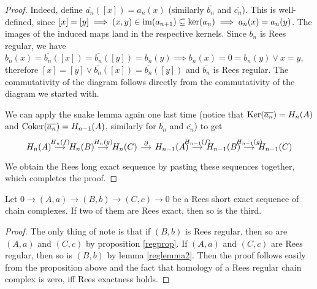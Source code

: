 \begin{proof}[Proof]
    Indeed, define $\overline{a_n}([x]) = a_n(x)$ (similarly $\overline{b_n}$ and $\overline{c_n}$). This is well-defined, since
    $[x]=[y] \implies (x,y)\in\text{im}(a_{n+1})\subseteq\mathrm{ker}(a_n) \implies a_n(x)=a_n(y)$. The images of the induced 
    maps land in the respective kernels. Since $b_n$ is Rees regular, we have
    $b_n(x)=\overline{b_n}([x])=\overline{b_n}([y])=b_n(y) \implies b_n(x)=0=b_n(y) \lor x=y$, therefore $[x]=[y] \lor \overline{b_n}([x])=\overline{b_n}([y])$
    and $\overline{b_n}$ is Rees regular. The commutativity of the diagram follows directly from the commutativity of the diagram
    we started with.\par 
    We can apply the snake lemma again one last time (notice that $\mathrm{Ker}(\overline{a_n}) = H_n(A)$ and $\mathrm{Coker}(\overline{a_n}) = H_{n-1}(A)$, similarly
    for $\overline{b_n}$ and $\overline{c_n}$) to get 
    \[\begin{tikzcd}[sep=small]
        {H_{n}(A)} & {H_n(B)} & {H_n(C)} & {H_{n-1}(A)} & {H_{n-1}(B)} & {H_{n-1}(C)}
        \arrow["{H_n(f)}", from=1-1, to=1-2]
        \arrow["{H_n(g)}", from=1-2, to=1-3]
        \arrow["\partial", from=1-3, to=1-4]
        \arrow["{H_{n-1}(f)}", from=1-4, to=1-5]
        \arrow["{H_{n-1}(g)}", from=1-5, to=1-6]
    \end{tikzcd}\]
    We obtain the Rees long exact sequence by pasting these sequences together, which completes the proof.
\end{proof}
\begin{corollary}
    Let $0 \to (A,a) \to (B,b) \to (C,c) \to 0$ be a Rees short exact sequence of chain complexes. If two of them are 
    Rees exact, then so is the third.
\end{corollary}
\begin{proof}[Proof]
    The only thing of note is that if $(B,b)$ is Rees regular, then so are $(A,a)$ and $(C,c)$ by proposition \ref{regprop}. 
    If $(A,a)$ and $(C,c)$ are Rees regular, then so is $(B,b)$ by lemma \ref{reglemma2}. Then the proof follows easily from the 
    proposition above and the fact that homology of a Rees regular chain complex is zero, iff Rees exactness holds.
\end{proof}
